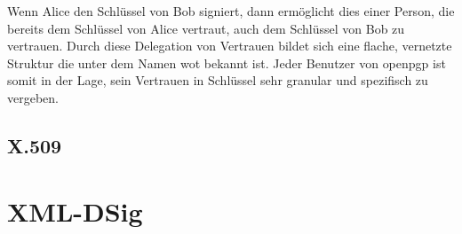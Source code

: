 Wenn Alice den Schlüssel von Bob signiert, dann ermöglicht dies einer Person, die bereits dem Schlüssel von Alice vertraut, auch dem Schlüssel von Bob zu
vertrauen. Durch diese Delegation von Vertrauen bildet sich eine flache, vernetzte Struktur die unter dem Namen \gls{wot} bekannt ist. Jeder Benutzer von
\gls{openpgp} ist somit in der Lage, sein Vertrauen in Schlüssel sehr granular und spezifisch zu vergeben.

\subsection{X.509}
\label{sec:GrundlagenDefinitionen:DigitaleSignaturen:Verfahren:x509}

\section{XML-DSig}
\label{sec:GrundlagenDefinitionen:xml-dsig}
